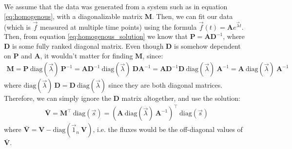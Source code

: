 \documentclass{article}
\begin{document}
We assume that the data was generated from a system such as in equation \ref{eq:homogenous}, with a diagonalizable matrix $\mathbf{M}$. Then, we can fit our data (which is $\vec{f}$ measured at multiple time points) using the formula $\vec{f}(t) = \mathbf{A} e^{\vec{\lambda} t}$. Then, from equation \ref{eq:homogenous_solution} we know that $\mathbf{P} = \mathbf{A} \mathbf{D}^{-1}$, where $\mathbf{D}$ is some fully ranked diagonal matrix. Even though $\mathbf{D}$ is somehow dependent on $\mathbf{P}$ and $\mathbf{A}$, it wouldn't matter for finding $\mathbf{M}$, since:
\begin{eqnarray}
    \mathbf{M} = \mathbf{P}~\text{diag}(\vec{\lambda})~\mathbf{P}^{-1} = \mathbf{A}\mathbf{D}^{-1}~\text{diag}(\vec{\lambda})~\mathbf{D}\mathbf{A}^{-1} = 
    \mathbf{A}\mathbf{D}^{-1}\mathbf{D}~\text{diag}(\vec{\lambda})~\mathbf{A}^{-1} = 
    \mathbf{A}~\text{diag}(\vec{\lambda})~\mathbf{A}^{-1}
\end{eqnarray}
where $\text{diag}(\vec{\lambda})~\mathbf{D} = \mathbf{D}~\text{diag}(\vec{\lambda})$ since they are both diagonal matrices. Therefore, we can simply ignore the $\mathbf{D}$ matrix altogether, and use the solution:
\begin{eqnarray}
    \mathbf{\bar{V}} = \mathbf{M}^\top~\text{diag}(\vec{s}) = \left(\mathbf{A}~\text{diag}(\vec{\lambda})~\mathbf{A}^{-1} \right)^\top~\text{diag}(\vec{s})
\end{eqnarray}
where $\mathbf{\bar{V}} = \mathbf{V} - \text{diag}(\vec{1}_n~\mathbf{V})$, i.e. the fluxes would be the off-diagonal values of $\mathbf{\bar{V}}$.



\end{document}
